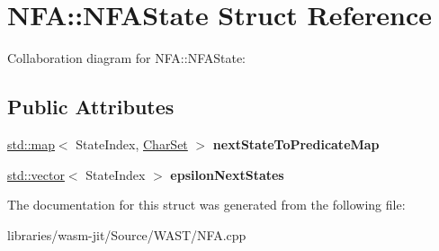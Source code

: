 \hypertarget{struct_n_f_a_1_1_n_f_a_state}{}\section{N\+FA\+:\+:N\+F\+A\+State Struct Reference}
\label{struct_n_f_a_1_1_n_f_a_state}


Collaboration diagram for N\+FA\+:\+:N\+F\+A\+State\+:
\subsection*{Public Attributes}
\begin{DoxyCompactItemize}
\item 
\mbox{\label{struct_n_f_a_1_1_n_f_a_state_ae13788d4108acbb13ff1ad901ef80dd8}} 
\mbox{\hyperlink{classstd_1_1map}{std\+::map}}$<$ State\+Index, \mbox{\hyperlink{struct_dense_static_int_set}{Char\+Set}} $>$ {\bfseries next\+State\+To\+Predicate\+Map}
\item 
\mbox{\label{struct_n_f_a_1_1_n_f_a_state_ae0ec1d173727cd5b3885fa948c8e2d22}} 
\mbox{\hyperlink{classstd_1_1vector}{std\+::vector}}$<$ State\+Index $>$ {\bfseries epsilon\+Next\+States}
\end{DoxyCompactItemize}


The documentation for this struct was generated from the following file\+:\begin{DoxyCompactItemize}
\item 
libraries/wasm-\/jit/\+Source/\+W\+A\+S\+T/N\+F\+A.\+cpp\end{DoxyCompactItemize}
